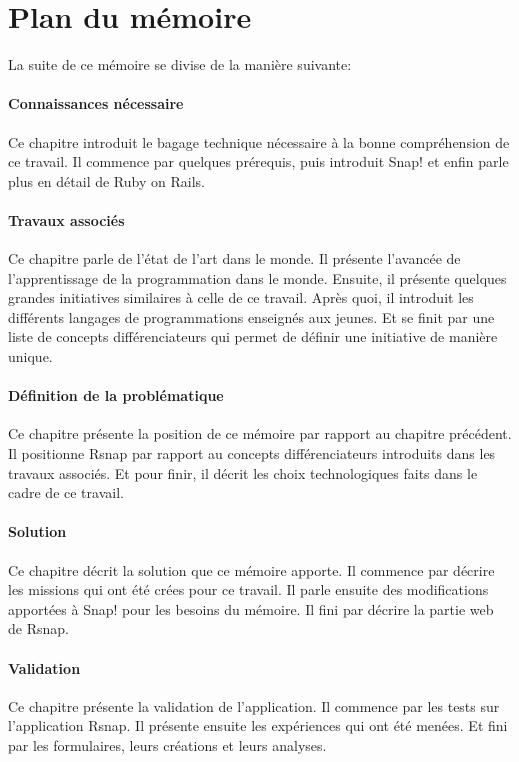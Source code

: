 \section{Plan du mémoire}
La suite de ce mémoire se divise de la manière suivante:

\paragraph{Connaissances nécessaire}
Ce chapitre introduit le bagage technique nécessaire à la bonne compréhension de ce travail. Il commence par quelques prérequis, puis introduit Snap! et enfin parle plus en détail de Ruby on Rails.

\paragraph{Travaux associés}
Ce chapitre parle de l'état de l'art dans le monde. Il présente l'avancée de l'apprentissage de la programmation dans le monde. Ensuite, il présente quelques grandes initiatives similaires à celle de ce travail. Après quoi, il introduit les différents langages de programmations enseignés aux jeunes. Et se finit par une liste de concepts différenciateurs qui permet de définir une initiative de manière unique.

\paragraph{Définition de la problématique}
Ce chapitre présente la position de ce mémoire par rapport au chapitre précédent. Il positionne Rsnap par rapport au concepts différenciateurs introduits dans les travaux associés. Et pour finir, il décrit les choix technologiques faits dans le cadre de ce travail.

\paragraph{Solution}
Ce chapitre décrit la solution que ce mémoire apporte. Il commence par décrire les missions qui ont été crées pour ce travail. Il parle ensuite des modifications apportées à Snap! pour les besoins du mémoire. Il fini par décrire la partie web de Rsnap.

\paragraph{Validation}
Ce chapitre présente la validation de l'application. Il commence par les tests sur l'application Rsnap. Il présente ensuite les expériences qui ont été menées. Et fini par les formulaires, leurs créations et leurs analyses.

